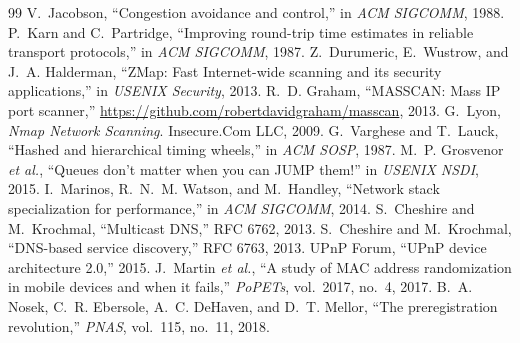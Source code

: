 \documentclass[conference]{IEEEtran}
\begin{document}
\begin{thebibliography}{99}
\balance
\footnotesize
{} V.~Jacobson, ``Congestion avoidance and control,'' in
\emph{ACM SIGCOMM}, 1988.
 P.~Karn and C.~Partridge, ``Improving round-trip time
estimates in reliable transport protocols,'' in \emph{ACM SIGCOMM}, 1987.
 Z.~Durumeric, E.~Wustrow, and J.~A. Halderman, ``ZMap: Fast
Internet-wide scanning and its security applications,'' in \emph{USENIX
Security}, 2013.
 R.~D. Graham, ``MASSCAN: Mass IP port scanner,''
\url{https://github.com/robertdavidgraham/masscan}, 2013.
 G.~Lyon, \emph{Nmap Network Scanning}. Insecure.Com LLC,
2009.
 G.~Varghese and T.~Lauck, ``Hashed and hierarchical
timing wheels,'' in \emph{ACM SOSP}, 1987.
 M.~P. Grosvenor \emph{et al.}, ``Queues don't matter
when you can JUMP them!'' in \emph{USENIX NSDI}, 2015.
 I.~Marinos, R.~N.~M. Watson, and M.~Handley, ``Network
stack specialization for performance,'' in \emph{ACM SIGCOMM}, 2014.
 S.~Cheshire and M.~Krochmal, ``Multicast DNS,'' RFC 6762,
2013.
 S.~Cheshire and M.~Krochmal, ``DNS-based service
discovery,'' RFC 6763, 2013.
 UPnP Forum, ``UPnP device architecture 2.0,'' 2015.
 J.~Martin \emph{et al.}, ``A study of MAC address
randomization in mobile devices and when it fails,'' \emph{PoPETs},
vol.~2017, no.~4, 2017.
 B.~A. Nosek, C.~R. Ebersole, A.~C. DeHaven, and D.~T.
Mellor, ``The preregistration revolution,'' \emph{PNAS}, vol.~115, no.~11,
2018.
\end{thebibliography}
\end{document}
